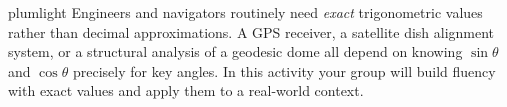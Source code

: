 \documentclass[10pt]{article}
\begin{document}
\namepartnerperiod

\vspace{0.1in}

\begin{scenariobox}{plumlight}
\small
Engineers and navigators routinely need \emph{exact} trigonometric values rather than decimal approximations.
A GPS receiver, a satellite dish alignment system, or a structural analysis of a geodesic dome all depend on
knowing $\sin\theta$ and $\cos\theta$ precisely for key angles.
In this activity your group will build fluency with exact values and apply them to a real-world context.
\end{scenariobox}

\vspace{0.12in}
\end{document}

